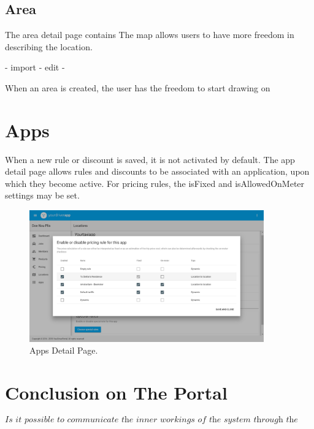 \subsection{Area}
The area detail page contains
The map allows users to have more freedom in describing the location.

- import
- edit
-

When an area is created, the user has the freedom to start drawing on



\section{Apps}
When a new rule or discount is saved, it is not activated by default. The app detail page allows rules and discounts to be associated with an application, upon which they become active. For pricing rules, the isFixed and isAllowedOnMeter settings may be set.

\begin{figure}[H]
	\centering
	\includegraphics[width=0.9\textwidth]{Apps}
	\caption[Apps Detail Page]{Apps Detail Page.}
	\label{fig:Apps Detail Page}
\end{figure}


\section{Conclusion on The Portal}
\[\textit{Is it possible to communicate the inner workings of the system through the user interface?}\]\hfill

